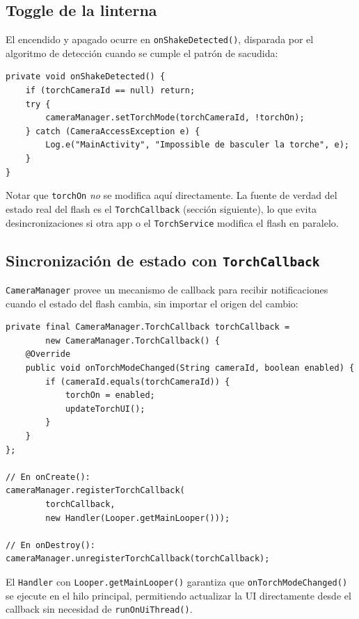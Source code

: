 \documentclass[12pt, a4paper]{article}
\begin{document}
\subsection{Toggle de la linterna}

El encendido y apagado ocurre en \texttt{onShakeDetected()}, disparada por el
algoritmo de detecci\'on cuando se cumple el patr\'on de sacudida:

\begin{lstlisting}[caption={Toggle de la linterna --- \texttt{MainActivity.java}}]
private void onShakeDetected() {
    if (torchCameraId == null) return;
    try {
        cameraManager.setTorchMode(torchCameraId, !torchOn);
    } catch (CameraAccessException e) {
        Log.e("MainActivity", "Impossible de basculer la torche", e);
    }
}
\end{lstlisting}

Notar que \texttt{torchOn} \emph{no} se modifica aqu\'i directamente.
La fuente de verdad del estado real del flash es el \texttt{TorchCallback}
(secci\'on siguiente), lo que evita desincronizaciones si otra app o el
\texttt{TorchService} modifica el flash en paralelo.

\subsection{Sincronizaci\'on de estado con \texttt{TorchCallback}}

\texttt{CameraManager} provee un mecanismo de callback para recibir
notificaciones cuando el estado del flash cambia, sin importar el origen del
cambio:

\begin{lstlisting}[caption={Registro y uso del \texttt{TorchCallback} --- \texttt{MainActivity.java}}]
private final CameraManager.TorchCallback torchCallback =
        new CameraManager.TorchCallback() {
    @Override
    public void onTorchModeChanged(String cameraId, boolean enabled) {
        if (cameraId.equals(torchCameraId)) {
            torchOn = enabled;
            updateTorchUI();
        }
    }
};

// En onCreate():
cameraManager.registerTorchCallback(
        torchCallback,
        new Handler(Looper.getMainLooper()));

// En onDestroy():
cameraManager.unregisterTorchCallback(torchCallback);
\end{lstlisting}

El \texttt{Handler} con \texttt{Looper.getMainLooper()} garantiza que
\texttt{onTorchModeChanged()} se ejecute en el hilo principal, permitiendo
actualizar la UI directamente desde el callback sin necesidad de
\texttt{runOnUiThread()}.
\end{document}
